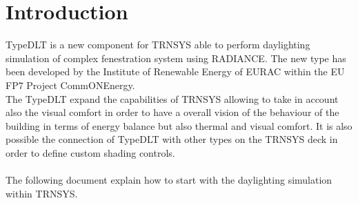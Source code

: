 \chapter*{Introduction}
TypeDLT is a new component for TRNSYS able to perform daylighting simulation of complex fenestration system using RADIANCE. The new type has been developed by the Institute of Renewable Energy of EURAC within the EU FP7 Project CommONEnergy. \\
The TypeDLT expand the capabilities of TRNSYS allowing to take in account also the visual comfort in order to have a overall vision of the behaviour of the building in terms of energy balance but also thermal and visual comfort. It is also possible the connection of TypeDLT with other types on the TRNSYS deck in order to define custom shading controls. 
\\
\\
The following document explain how to start with the daylighting simulation within TRNSYS. 